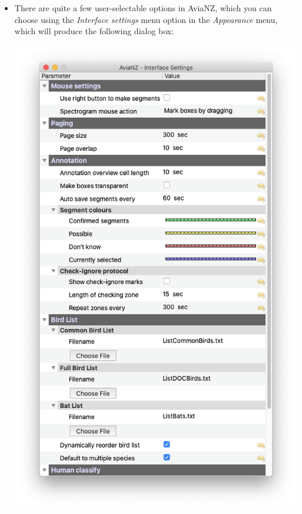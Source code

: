 \documentclass{scrartcl}
\begin{document}
\begin{itemize}
	\item There are quite a few user-selectable options in AviaNZ, which you can choose using the \textit{Interface settings} menu option in the \textit{Appearance} menu, which will produce the following dialog box:
\begin{center}
    \includegraphics[width=.65\textwidth]{Figures/InterfaceSettings}
\end{center}


\end{itemize}
\end{document}
